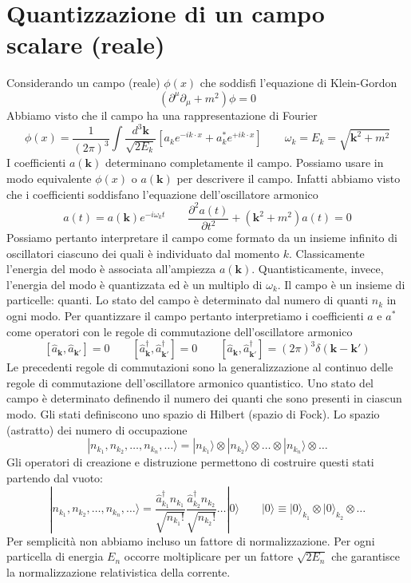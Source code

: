 \section{Quantizzazione di un campo scalare (reale)}
Considerando un campo (reale) $\phi(x)$ che soddisfi l'equazione di Klein-Gordon
$$
(\partial^\mu\partial_\mu + m^2)\phi = 0
$$
Abbiamo visto che il campo ha una rappresentazione di Fourier
$$
\phi(x) = \frac{1}{(2\pi)^3} \int \frac{d^3\mathbf{k}}{\sqrt{2E_k}} [a_k e^{-ik\cdot x} + a_k^* e^{+ik\cdot x}] \qquad \omega_k = E_k = \sqrt{\mathbf{k}^2 + m^2}
$$
I coefficienti $a(\mathbf{k})$ determinano completamente il campo. Possiamo usare in modo equivalente $\phi(x)$ o $a(\mathbf{k})$ per descrivere il campo. Infatti abbiamo visto che i coefficienti soddisfano l'equazione dell'oscillatore armonico
$$
a(t) = a(\mathbf{k})e^{-i\omega_k t} \qquad \frac{\partial^2 a(t)}{\partial t^2} + (\mathbf{k}^2 + m^2)a(t) = 0
$$
Possiamo pertanto interpretare il campo come formato da un insieme infinito di oscillatori ciascuno dei quali è individuato dal momento $k$. Classicamente l'energia del modo è associata all'ampiezza $a(\mathbf{k})$. Quantisticamente, invece, l'energia del modo è quantizzata ed è un multiplo di $\omega_k$. Il campo è un insieme di particelle: quanti. Lo stato del campo è determinato dal numero di quanti $n_k$ in ogni modo. Per quantizzare il campo pertanto interpretiamo i coefficienti $a$ e $a^*$ come operatori con le regole di commutazione dell'oscillatore armonico
$$
[\hat{a}_{\mathbf{k}}, \hat{a}_{\mathbf{k}'}] = 0 \qquad [\hat{a}_{\mathbf{k}}^\dagger, \hat{a}_{\mathbf{k}'}^\dagger] = 0 \qquad [\hat{a}_{\mathbf{k}}, \hat{a}_{\mathbf{k}'}^\dagger] = (2\pi)^3 \delta(\mathbf{k} - \mathbf{k}')
$$
Le precedenti regole di commutazioni sono la generalizzazione al continuo delle regole di commutazione dell'oscillatore armonico quantistico. Uno stato del campo è determinato definendo il numero dei quanti che sono presenti in ciascun modo. Gli stati definiscono uno spazio di Hilbert (spazio di Fock). Lo spazio (astratto) dei numero di occupazione
$$
|n_{k_1}, n_{k_2}, \dots, n_{k_n}, \dots \rangle = |n_{k_1}\rangle \otimes |n_{k_2}\rangle \otimes \dots \otimes |n_{k_n}\rangle \otimes \dots
$$
Gli operatori di creazione e distruzione permettono di costruire questi stati partendo dal vuoto:
$$
|n_{k_1}, n_{k_2}, \dots, n_{k_n}, \dots \rangle = \frac{\hat{a}_{k_1}^\dagger n_{k_1}}{\sqrt{n_{k_1}!}} \frac{\hat{a}_{k_2}^\dagger n_{k_2}}{\sqrt{n_{k_2}!}} \dots |0\rangle \qquad |0\rangle \equiv |0\rangle_{k_1} \otimes |0\rangle_{k_2} \otimes \dots
$$
Per semplicità non abbiamo incluso un fattore di normalizzazione. Per ogni particella di energia $E_n$ occorre moltiplicare per un fattore $\sqrt{2E_n}$ che garantisce la normalizzazione relativistica della corrente.
